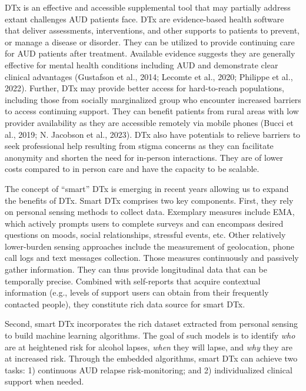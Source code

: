 \documentclass[
  letterpaper,
  DIV=11,
  numbers=noendperiod]{scrartcl}
\begin{document}
DTx is an effective and accessible supplemental tool that may partially
address extant challenges AUD patients face. DTx are evidence-based
health software that deliver assessments, interventions, and other
supports to patients to prevent, or manage a disease or disorder. They
can be utilized to provide continuing care for AUD patients after
treatment. Available evidence suggests they are generally effective for
mental health conditions including AUD and demonstrate clear clinical
advantages (Gustafson et al., 2014; Lecomte et al., 2020; Philippe et
al., 2022). Further, DTx may provide better access for hard-to-reach
populations, including those from socially marginalized group who
encounter increased barriers to access continuing support. They can
benefit patients from rural areas with low provider availability as they
are accessible remotely via mobile phones (Bucci et al., 2019; N.
Jacobson et al., 2023). DTx also have potentials to relieve barriers to
seek professional help resulting from stigma concerns as they can
facilitate anonymity and shorten the need for in-person interactions.
They are of lower costs compared to in person care and have the capacity
to be scalable.

The concept of ``smart'' DTx is emerging in recent years allowing us to
expand the benefits of DTx. Smart DTx comprises two key components.
First, they rely on personal sensing methods to collect data. Exemplary
measures include EMA, which actively prompts users to complete surveys
and can encompass desired questions on moods, social relationships,
stressful events, etc. Other relatively lower-burden sensing approaches
include the measurement of geolocation, phone call logs and text
messages collection. Those measures continuously and passively gather
information. They can thus provide longitudinal data that can be
temporally precise. Combined with self-reports that acquire contextual
information (e.g., levels of support users can obtain from their
frequently contacted people), they constitute rich data source for smart
DTx.

Second, smart DTx incorporates the rich dataset extracted from personal
sensing to build machine learning algorithms. The goal of such models is
to identify \emph{who} are at heightened risk for alcohol lapses,
\emph{when} they will lapse, and \emph{why} they are at increased risk.
Through the embedded algorithms, smart DTx can achieve two tasks: 1)
continuous AUD relapse risk-monitoring; and 2) individualized clinical
support when needed.
\end{document}
